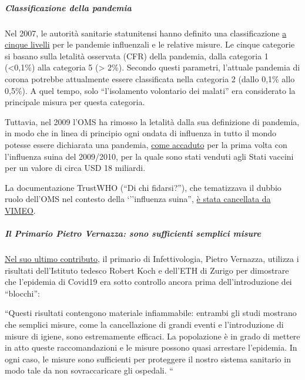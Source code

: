 \hypertarget{classificazione-della-pandemia}{%
\subparagraph{\texorpdfstring{\textbf{Classificazione della
pandemia}}{Classificazione della pandemia}}\label{classificazione-della-pandemia}}

Nel 2007, le autorità sanitarie statunitensi hanno definito una
classificazione
\href{https://www.cidrap.umn.edu/news-perspective/2007/02/hhs-ties-pandemic-mitigation-advice-severity}{a
cinque livelli} per le pandemie influenzali e le relative misure. Le
cinque categorie si basano sulla letalità osservata (CFR) della
pandemia, dalla categoria 1 (\textless{}0,1\%) alla categoria 5
(\textgreater{} 2\%). Secondo questi parametri, l'attuale pandemia di
corona potrebbe attualmente essere classificata nella categoria 2 (dallo
0,1\% allo 0,5\%). A quel tempo, solo ``l'isolamento volontario dei
malati'' era considerato la principale misura per questa categoria.

Tuttavia, nel 2009 l'OMS ha rimosso la letalità dalla sua definizione di
pandemia, in modo che in linea di principio ogni ondata di influenza in
tutto il mondo potesse essere dichiarata una pandemia,
\href{https://www.forbes.com/2010/02/05/world-health-organization-swine-flu-pandemic-opinions-contributors-michael-fumento.html}{come
accaduto} per la prima volta con l'influenza suina del 2009/2010, per la
quale sono stati venduti agli Stati vaccini per un valore di circa USD
18 miliardi.

La documentazione TrustWHO (``Di chi fidarsi?''), che tematizzava il
dubbio ruolo dell'OMS nel contesto della `''influenza suina'',
\href{https://www.youtube.com/watch?v=VjQGyqVN5RM}{è stata cancellata da
VIMEO}.

\hypertarget{il-primario-pietro-vernazza-sono-sufficienti-semplici-misure}{%
\subparagraph{\texorpdfstring{\textbf{Il Primario Pietro Vernazza: sono
sufficienti semplici
misure}}{Il Primario Pietro Vernazza: sono sufficienti semplici misure}}\label{il-primario-pietro-vernazza-sono-sufficienti-semplici-misure}}

\href{https://infekt.ch/2020/04/sind-wir-tatsaechlich-im-blindflug/}{Nel
suo ultimo contributo}, il primario di Infettivologia, Pietro Vernazza,
utilizza i risultati dell'Istituto tedesco Robert Koch e dell'ETH di
Zurigo per dimostrare che l'epidemia di Covid19 era sotto controllo
ancora prima dell'introduzione dei ``blocchi'':

``Questi risultati contengono materiale infiammabile: entrambi gli studi
mostrano che semplici misure, come la cancellazione di grandi eventi e
l'introduzione di misure di igiene, sono estremamente efficaci. La
popolazione è in grado di mettere in atto queste raccomandazioni e le
misure possono quasi arrestare l'epidemia. In ogni caso, le misure sono
sufficienti per proteggere il nostro sistema sanitario in modo tale da
non sovraccaricare gli ospedali. ``


